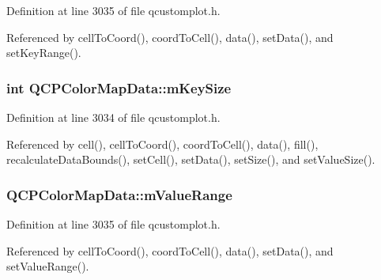 Definition at line 3035 of file qcustomplot.\+h.



Referenced by cell\+To\+Coord(), coord\+To\+Cell(), data(), set\+Data(), and set\+Key\+Range().

\hypertarget{class_q_c_p_color_map_data_a354e06462023340fbc03894b22499f6d}{}
\subsubsection[{m\+Key\+Size}]{\setlength{\rightskip}{0pt plus 5cm}int Q\+C\+P\+Color\+Map\+Data\+::m\+Key\+Size\hspace{0.3cm}{\ttfamily [protected]}}\label{class_q_c_p_color_map_data_a354e06462023340fbc03894b22499f6d}


Definition at line 3034 of file qcustomplot.\+h.



Referenced by cell(), cell\+To\+Coord(), coord\+To\+Cell(), data(), fill(), recalculate\+Data\+Bounds(), set\+Cell(), set\+Data(), set\+Size(), and set\+Value\+Size().

\hypertarget{class_q_c_p_color_map_data_a225bb96f10c1a27b51ae59249477dbef}{}
\subsubsection[{m\+Value\+Range}]{ Q\+C\+P\+Color\+Map\+Data\+::m\+Value\+Range\hspace{0.3cm}{\ttfamily [protected]}}\label{class_q_c_p_color_map_data_a225bb96f10c1a27b51ae59249477dbef}


Definition at line 3035 of file qcustomplot.\+h.



Referenced by cell\+To\+Coord(), coord\+To\+Cell(), data(), set\+Data(), and set\+Value\+Range().

\hypertarget{class_q_c_p_color_map_data_ae8ee9093632a59f55eb4fc06579ed256}{}
